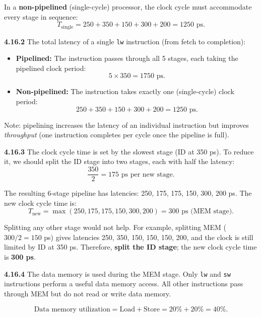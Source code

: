 In a \textbf{non-pipelined} (single-cycle) processor, the clock cycle must
accommodate every stage in sequence:
\[
  T_{\text{single}} = 250 + 350 + 150 + 300 + 200 = 1250\text{ ps.}
\]

\medskip\noindent\textbf{4.16.2}
The total latency of a single \texttt{lw} instruction (from fetch to
completion):

\begin{itemize}
  \item \textbf{Pipelined:} The instruction passes through all 5 stages, each
        taking the pipelined clock period:
        \[
          5 \times 350 = 1750\text{ ps.}
        \]
  \item \textbf{Non-pipelined:} The instruction takes exactly one (single-cycle)
        clock period:
        \[
          250 + 350 + 150 + 300 + 200 = 1250\text{ ps.}
        \]
\end{itemize}

\noindent Note: pipelining increases the latency of an individual instruction
but improves \emph{throughput} (one instruction completes per cycle once the
pipeline is full).

\medskip\noindent\textbf{4.16.3}
The clock cycle time is set by the slowest stage (ID at 350 ps). To reduce
it, we should split the ID stage into two stages, each with half the
latency:
\[
  \frac{350}{2} = 175\text{ ps per new stage.}
\]

The resulting 6-stage pipeline has latencies: 250, 175, 175, 150, 300, 200 ps.
The new clock cycle time is:
\[
  T_{\text{new}} = \max(250, 175, 175, 150, 300, 200) = 300\text{ ps (MEM stage).}
\]

\noindent Splitting any other stage would not help. For example, splitting
MEM ($300/2 = 150$ ps) gives latencies 250, 350, 150, 150, 150, 200, and
the clock is still limited by ID at 350 ps. Therefore, \textbf{split the ID
stage}; the new clock cycle time is \textbf{300 ps}.

\medskip\noindent\textbf{4.16.4}
The data memory is used during the MEM stage. Only \texttt{lw} and
\texttt{sw} instructions perform a useful data memory access. All other
instructions pass through MEM but do not read or write data memory.

\[
  \text{Data memory utilization} = \text{Load} + \text{Store}
    = 20\% + 20\% = \boxed{40\%.}
\]

